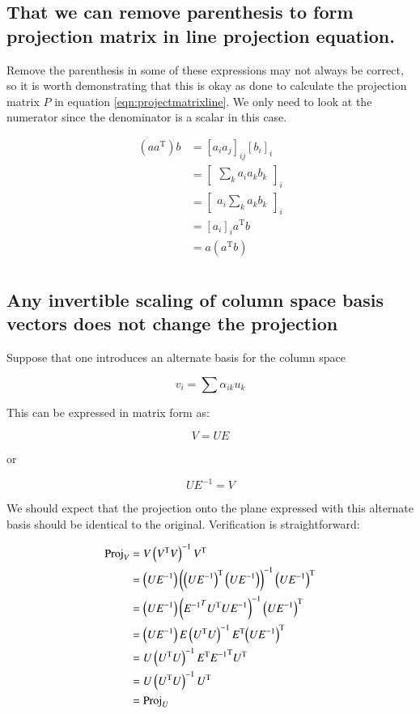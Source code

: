 \documentclass{article}      %
\newcommand{\T}[0]{\text{T}}
\begin{document}
\subsection{ That we can remove parenthesis to form projection matrix in line projection equation. }

Remove the parenthesis in some of these expressions may not always be correct, so it is worth demonstrating that this is okay as
done to calculate the projection matrix $P$ in 
equation \ref{eqn:projectmatrixline}.
We only need to look at the numerator since the denominator is a scalar in this case.

\begin{align*}
(a a^\T) b
&= [ a_i a_j ]_{ij} [b_i]_i \\
&= 
{\begin{bmatrix}
\sum_k a_i a_k b_k
\end{bmatrix}
}_i \\
&= 
{\begin{bmatrix}
a_i \sum_k a_k b_k
\end{bmatrix}
}_i \\
&= [ a_i ]_i a^\T b \\
&= a (a^\T b) \\
\end{align*}



\subsection{ Any invertible scaling of column space basis vectors does not change the projection }


Suppose that one introduces an alternate basis for the column space


\[
v_i = \sum \alpha_{ik} u_k
\]

This can be expressed in matrix form as:

\[
V = U E
\]

or

\[
U E^{-1} = V
\]

We should expect that the projection onto the plane expressed with this alternate basis should be identical to the original.  Verification
is straightforward:

\begin{align*}
\Proj_V 
&= V \left(V^\T V\right)^{-1} V^\T \\
&= \left(U E^{-1}\right) \left({\left(U E^{-1}\right)}^\T \left(U E^{-1}\right)\right)^{-1} {\left(U E^{-1}\right)}^\T \\
&= \left(U E^{-1}\right) \left( {E^{-1}}^T U^\T U E^{-1}\right)^{-1} {\left(U E^{-1}\right)}^\T \\
&= \left(U E^{-1}\right) E \left( U^\T U\right)^{-1} E^\T {\left(U E^{-1}\right)}^\T \\
&= U \left( U^\T U\right)^{-1} E^\T {E^{-1}}^\T U^\T \\
&= U \left( U^\T U\right)^{-1} U^\T \\
&= \Proj_U
\end{align*}
\end{document}
